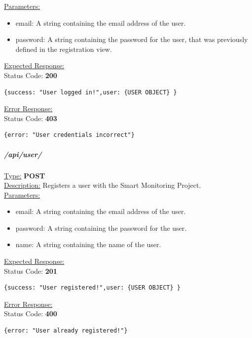 \documentclass[draft,preprint,12pt,3p]{elsarticle}
\newcommand{\forceindent}{\leavevmode{\parindent=1em\indent}}
\begin{document}
\underline{Parameters:}
\begin{itemize}
\item email: A string containing the email address of the user.

\item password: A string containing the password for the user, that was previously defined in the registration view.

\end{itemize}

\underline{Expected Response:}\\[5pt]
\forceindent Status Code: \textbf{200} \\
\begin{verbatim}
{success: "User logged in!",user: {USER OBJECT} }
\end{verbatim}
\underline{Error Response:}\\[5pt]
\forceindent Status Code: \textbf{403} \\
\begin{verbatim}
{error: "User credentials incorrect"}
\end{verbatim}


\subparagraph*{/api/user/}


\underline{Type:} \textbf{POST}\\

\underline{Description:} Registers a user with the Smart Monitoring Project.\\

\underline{Parameters:}
\begin{itemize}
\item email: A string containing the email address of the user.

\item password: A string containing the password for the user.

\item name: A string containing the name of the user.

\end{itemize}

\underline{Expected Response:}\\[5pt]
\forceindent Status Code: \textbf{201} \\
\begin{verbatim}
{success: "User registered!",user: {USER OBJECT} }
\end{verbatim}
\underline{Error Response:}\\[5pt]
\forceindent Status Code: \textbf{400} \\
\begin{verbatim}
{error: "User already registered!"}
\end{verbatim}
\end{document}
